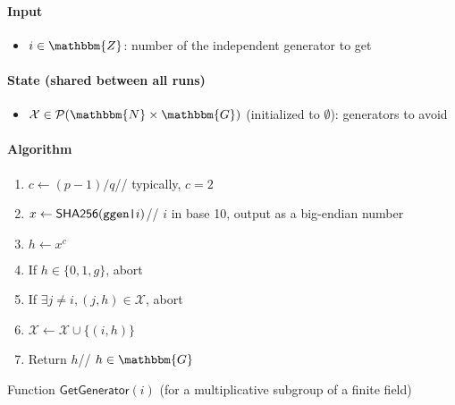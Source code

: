 \documentclass[a4paper]{article}
\newcommand{\G}{\mathbbm{G}}
\newcommand{\Z}{\mathbbm{Z}}
\newcommand{\N}{\mathbbm{N}}
\newcommand{\shatwo}{\textsf{SHA256}}
\begin{document}
\begin{table}
  \begin{framed}
    \noindent\paragraph{Input}
    \begin{itemize}
    \item $i\in\Z$: number of the independent generator to get
    \end{itemize}
    \noindent\paragraph{State (shared between all runs)}
    \begin{itemize}
    \item $\mathcal{X}\in\mathcal{P}(\N\times\G)$ (initialized to
      $\emptyset$): generators to avoid
    \end{itemize}
    \noindent\paragraph{Algorithm}
    \begin{enumerate}
    \item $c\leftarrow(p-1)/q$\hfill// typically, $c=2$
    \item $x\leftarrow\shatwo(\verb=ggen|=i)$\hfill// $i$ in base 10,
      output as a big-endian number
    \item $h\leftarrow x^c$
    \item If $h\in\{0,1,g\}$, abort
    \item If $\exists j\neq i, (j,h)\in\mathcal{X}$, abort
    \item $\mathcal{X}\leftarrow\mathcal{X}\cup\{(i,h)\}$
    \item Return $h$\hfill// $h\in\G$
    \end{enumerate}
  \end{framed}
  \caption{Function $\mathsf{GetGenerator}(i)$ (for a multiplicative subgroup of a finite field)}
  \label{get-generator}
\end{table}
\end{document}
